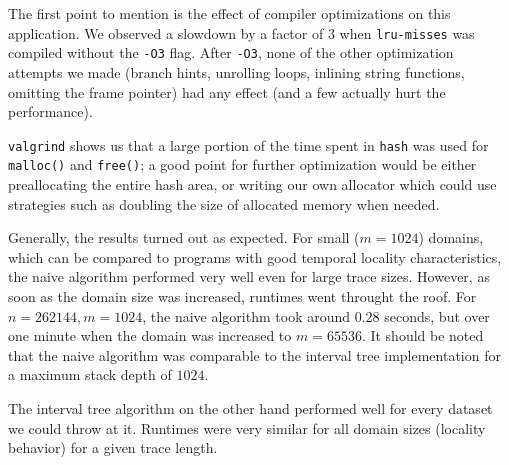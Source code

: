\documentclass[a4paper,10pt]{article}
\begin{document}
The first point to mention is the effect of compiler optimizations on this application.
We observed a slowdown by a factor of $3$ when \verb|lru-misses| was compiled without the \verb|-O3| flag.
After \verb|-O3|, none of the other optimization attempts we made (branch hints, unrolling loops, inlining
string functions, omitting the frame pointer) had any effect (and a few actually hurt the
performance).

\verb|valgrind| shows us that a large portion
of the time spent in \verb|hash| was
used for \lstinline|malloc()| and \lstinline|free()|; a good point for
further optimization would be either preallocating the entire hash area, or writing
our own allocator which could use strategies such as doubling the size of allocated
memory when needed.

Generally, the results turned out as expected. For small ($m = 1024$) domains, which can be compared
to programs with good temporal locality characteristics, the naive algorithm performed
very well even for large trace sizes. However, as soon as the domain size was increased,
runtimes went throught the roof. For $n = 262144, m = 1024$, the naive algorithm took around $0.28$ seconds,
but over one minute when the domain was increased to $m = 65536$. It should be noted that the
naive algorithm was comparable to the interval tree implementation for a maximum stack depth of $1024$.

The interval tree algorithm on the other hand performed well for every dataset we could throw
at it. Runtimes were very similar for all domain sizes (locality behavior) for a given trace
length.

\end{document}
